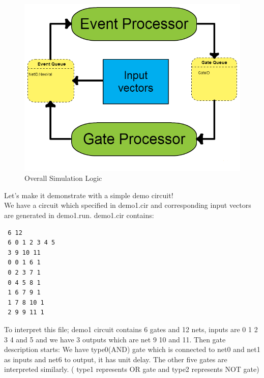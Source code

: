 \documentclass[a4paper,onesided,12pt]{report}
\begin{document}
 \begin{figure}[htbp]
 		\centering
 		\includegraphics[height=0.30\textheight]{diagram.png}
 		\caption{Overall Simulation Logic}
 \end{figure}
 
 Let's make it demonstrate with a simple demo circuit! \\
 We have a circuit which specified in demo1.cir and corresponding input vectors are generated in demo1.run. demo1.cir contains:
 \begin{verbatim}
 6 12
 6 0 1 2 3 4 5
 3 9 10 11
 0 0 1 6 1
 0 2 3 7 1
 0 4 5 8 1
 1 6 7 9 1
 1 7 8 10 1
 2 9 9 11 1
 \end{verbatim}
 To interpret this file; demo1 circuit contains 6 gates and 12 nets, inputs are 0 1 2 3 4 and 5 and we have 3 outputs which are net 9 10 and 11. Then gate description starts: We have type0(AND) gate which is connected to net0 and net1 as inputs and net6 to output, it has unit delay. The other five gates are interpreted similarly. ( type1 represents OR gate and type2 represents NOT gate)
\end{document}
